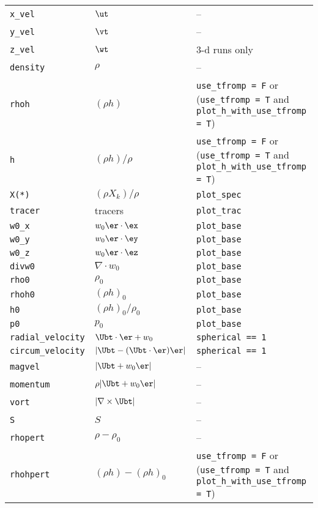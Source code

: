 {\begin{center}
\begin{longtable}{|l|p{2.25in}|p{2.5in}|}
{\tt x\_vel}   & $\ut$  & -- \\
{\tt y\_vel}   & $\vt$  & -- \\
{\tt z\_vel}   & $\wt$  & 3-d runs only \\
{\tt density}  & $\rho$ & -- \\
{\tt rhoh}   & $(\rho h)$ & {\tt use\_tfromp = F} or ({\tt use\_tfromp = T} and {\tt plot\_h\_with\_use\_tfromp = T}) \\           
{\tt h}      & $(\rho h)/\rho$   & {\tt use\_tfromp = F} or ({\tt use\_tfromp = T} and {\tt plot\_h\_with\_use\_tfromp = T}) \\           
{\tt X(*)}   & $(\rho X_k)/\rho$ & {\tt plot\_spec} \\
{\tt tracer} & tracers           & {\tt plot\_trac} \\
{\tt w0\_x}  & $w_0 \er \cdot \ex$ & {\tt plot\_base} \\ 
{\tt w0\_y}  & $w_0 \er \cdot \ey$ & {\tt plot\_base} \\ 
{\tt w0\_z}  & $w_0 \er \cdot \ez$ & {\tt plot\_base} \\ 
{\tt divw0}  & $\nabla \cdot w_0$  & {\tt plot\_base} \\ 
{\tt rho0}   & $\rho_0$            & {\tt plot\_base} \\ 
{\tt rhoh0}  & $(\rho h)_0$         & {\tt plot\_base} \\ 
{\tt h0}     & $(\rho h)_0/\rho_0$  & {\tt plot\_base} \\ 
{\tt p0}     & $p_0$                & {\tt plot\_base} \\ 
{\tt radial\_velocity}  & $\Ubt \cdot \er + w_0$ & {\tt spherical == 1} \\
{\tt circum\_velocity}  & $| \Ubt - (\Ubt \cdot \er) \er |$ &  {\tt spherical == 1}  \\
{\tt magvel}              & $| \Ubt + w_0 \er |$  & -- \\
{\tt momentum}            & $\rho | \Ubt + w_0 \er |$  & -- \\
{\tt vort}                & $| \nabla \times \Ubt |$   & -- \\
{\tt S}                   & $S$   & -- \\
{\tt rhopert}             & $\rho - \rho_0$  & -- \\
{\tt rhohpert}          & $(\rho h) - (\rho h)_0$ & {\tt use\_tfromp = F} or ({\tt use\_tfromp = T} and {\tt plot\_h\_with\_use\_tfromp = T}) \\           

\end{longtable}
\end{center}}
